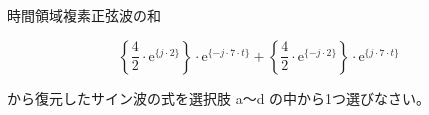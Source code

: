 時間領域複素正弦波の和

\[
\left \{ \frac{4}{2} \cdot \textrm{e}^{\{ j \cdot 2 \}} \right \} \cdot \textrm{e}^{\{-j \cdot 7 \cdot t \}} +  
\left \{ \frac{4}{2} \cdot \textrm{e}^{\{-j \cdot 2 \}} \right \} \cdot \textrm{e}^{\{ j \cdot 7 \cdot t \}}
\]

\bigskip
\noindent から復元したサイン波の式を選択肢 a〜d の中から1つ選びなさい。
